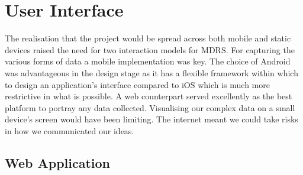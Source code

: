 \documentclass{l3proj}
\begin{document}
\section{User Interface} The realisation that the project would be spread across
both mobile and static devices raised the need for two interaction models for
MDRS. For capturing the various forms of data a mobile implementation was key. The choice of Android was advantageous in the design stage as it has a flexible framework within which to design an application's interface compared to iOS which is much more restrictive in what is possible. A web counterpart served excellently as the best platform to portray any data collected. Visualising our complex data on a small device's screen would have been limiting. The internet meant we could take risks in how we communicated our ideas.

\subsection{Web Application}


\end{document}
